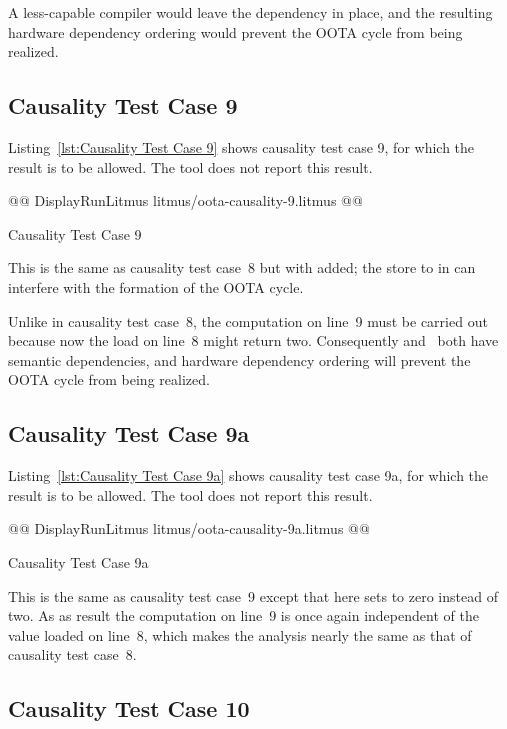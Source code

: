 \documentclass[10]{article}
\begin{document}
A less-capable compiler would leave the dependency in place,
and the resulting hardware dependency ordering would prevent
the OOTA cycle from being realized.

\subsection{Causality Test Case 9}
\label{app:Causality Test Case 9}

Listing~\ref{lst:Causality Test Case 9}
shows causality test case 9, for which the 
result is to be allowed.
The  tool does not report this result.

\begin{listing}[tbp]
@@ DisplayRunLitmus litmus/oota-causality-9.litmus @@
\caption{Causality Test Case 9}
\label{lst:Causality Test Case 9}
\end{listing}

This is the same as causality test case~8 but with  added;
the store to  in  can interfere with the formation of the
OOTA cycle.

Unlike in causality test case~8, the computation on line~9 must be
carried out because now the load on line~8 might return two.
Consequently  and~ both have semantic dependencies,
and hardware dependency ordering will prevent the OOTA cycle from
being realized.

\subsection{Causality Test Case 9a}
\label{app:Causality Test Case 9a}

Listing~\ref{lst:Causality Test Case 9a}
shows causality test case 9a, for which the 
result is to be allowed.
The  tool does not report this result.

\begin{listing}[tbp]
@@ DisplayRunLitmus litmus/oota-causality-9a.litmus @@
\caption{Causality Test Case 9a}
\label{lst:Causality Test Case 9a}
\end{listing}

This is the same as causality test case~9 except that here 
sets  to zero instead of two.
As as result the computation on line~9 is once again independent of
the value loaded on line~8, which makes the analysis nearly the same
as that of causality test case~8.

\subsection{Causality Test Case 10}
\label{app:Causality Test Case 10}
\end{document}
